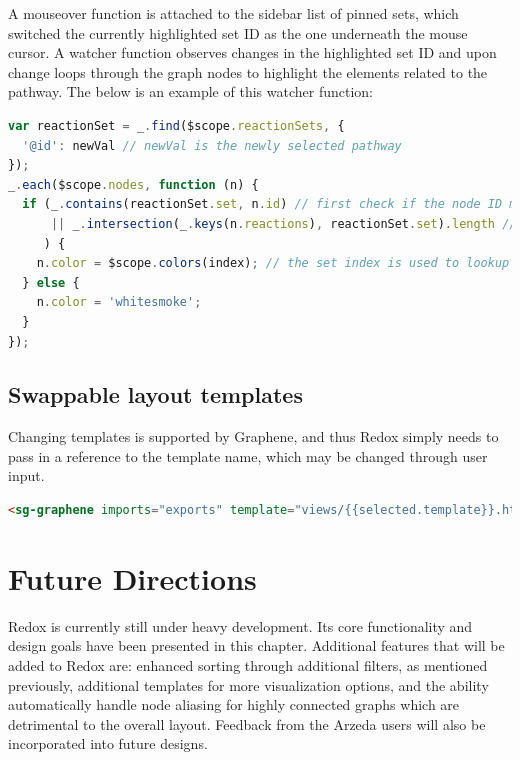 A mouseover function is attached to the sidebar list of pinned sets, which switched the currently highlighted set ID as the one underneath the mouse cursor.
A watcher function observes changes in the highlighted set ID and upon change loops through the graph nodes to highlight the elements related to the pathway.
The below is an example of this watcher function:
\begin{lstlisting}[language=JavaScript]
var reactionSet = _.find($scope.reactionSets, {
  '@id': newVal // newVal is the newly selected pathway
});
_.each($scope.nodes, function (n) {
  if (_.contains(reactionSet.set, n.id) // first check if the node ID matches the reactions listed
      || _.intersection(_.keys(n.reactions), reactionSet.set).length // each node contains a hash table with reactions that the compound is a part of
     ) {
    n.color = $scope.colors(index); // the set index is used to lookup the color value
  } else {
    n.color = 'whitesmoke';
  }
});
\end{lstlisting}

\subsection{Swappable layout templates}
Changing templates is supported by Graphene, and thus Redox simply needs to pass in a reference to the template name, which may be changed through user input.

\begin{lstlisting}[language=html]
<sg-graphene imports="exports" template="views/{{selected.template}}.html"></sg-graphene>
\end{lstlisting}

\section{Future Directions}
Redox is currently still under heavy development.
Its core functionality and design goals have been presented in this chapter.
Additional features that will be added to Redox are: enhanced sorting through additional filters, as mentioned previously, additional templates for more visualization options, and the ability automatically handle node aliasing for highly connected graphs which are detrimental to the overall layout.
Feedback from the Arzeda users will also be incorporated into future designs.


